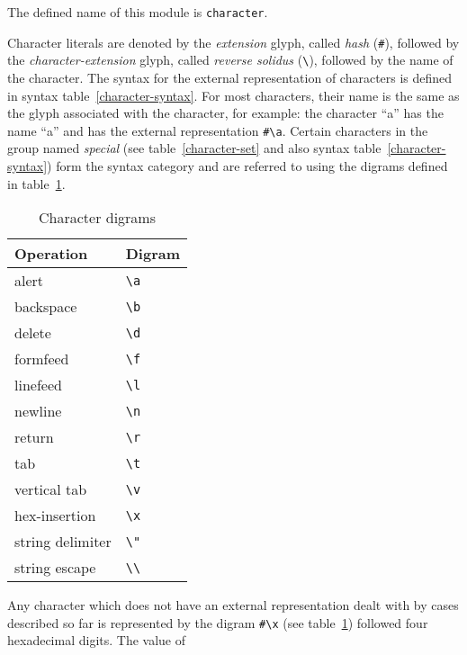 %
\begin{optDefinition}
%
The defined name of this module is {\tt character}.

%
Character literals are denoted by the {\em
    extension\/} glyph, called {\em hash} (\verb+#+), followed by the {\em
    character-extension\/}
glyph, called {\em reverse solidus\/} (\verb+\+), followed by the name of the
character.  The syntax for the external representation of characters is defined
in syntax table~\ref{character-syntax}.  For most characters, their name is the
same as the glyph associated with the character, for example: the character
``a'' has the name ``a'' and has the external representation \verb+#\a+.
Certain characters in the group named {\em special\/} (see
table~\ref{character-set} and also syntax table~\ref{character-syntax}) form the
syntax category  and are referred to using the
digrams defined in table~\ref{character-digrams}.
%
\begin{table}[h]
\label{character-digrams}
\caption{Character digrams}%
\begin{center}
\begin{tabular}{|ll|}\hline
    Operation & Digram \\
    \hline
    alert & \verb+\a+ \\
    backspace & \verb+\b+ \\
    delete & \verb+\d+ \\
    formfeed & \verb+\f+ \\
    linefeed & \verb+\l+ \\
    newline & \verb+\n+ \\
    return & \verb+\r+ \\
    tab & \verb+\t+ \\
    vertical tab & \verb+\v+ \\
    hex-insertion & \verb+\x+ \\
    string delimiter & \verb+\"+ \\
    string escape & \verb+\\+ \\
    \hline
\end{tabular}
\end{center}
\end{table}
%
Any character which does not have an external representation dealt with by cases
described so far is represented by the digram \verb+#\x+ (see
table~\ref{character-digrams}) followed four hexadecimal digits.  The value of

\end{optDefinition}
